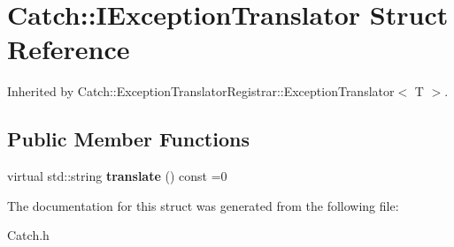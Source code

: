 \hypertarget{struct_catch_1_1_i_exception_translator}{\section{Catch\-:\-:I\-Exception\-Translator Struct Reference}
\label{struct_catch_1_1_i_exception_translator}
}


Inherited by Catch\-::\-Exception\-Translator\-Registrar\-::\-Exception\-Translator$<$ T $>$.

\subsection*{Public Member Functions}
\begin{DoxyCompactItemize}
\item 
\hypertarget{struct_catch_1_1_i_exception_translator_ade89aa305d8c89576521e76b2d1f82eb}{virtual std\-::string {\bfseries translate} () const =0}\label{struct_catch_1_1_i_exception_translator_ade89aa305d8c89576521e76b2d1f82eb}

\end{DoxyCompactItemize}


The documentation for this struct was generated from the following file\-:\begin{DoxyCompactItemize}
\item 
Catch.\-h\end{DoxyCompactItemize}
